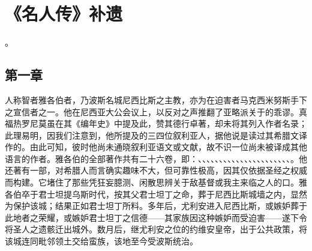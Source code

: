 
\chapter{《名人传》补遗}


。\par

\par


\section{第一章}

人称智者雅各伯者，乃波斯名城尼西比斯之主教，亦为在迫害者马克西米努斯手下之宣信者之一。他在尼西亚大公会议上，以反对之声推翻了亚略派关于的乖谬。真福热罗尼莫虽在其《编年史》中提及此，赞其德行卓著，却未将其列入作者名录；此理易明，因我们注意到，他所提及的三四位叙利亚人，据他说是读过其希腊文译作的。由此可知，彼时他尚未通晓叙利亚语文或文献，故不识一位尚未被译成其他语言的作者。雅各伯的全部著作共有二十六卷，即：、、、、、、、、、、、、、、、、、、、、、、。他还著有一部，对希腊人而言确实趣味不大，但可靠性极高，因其仅依据圣经之权威而构建。它堵住了那些凭狂妄臆测、闲散思辨关于敌基督或我主来临之人的口。雅各伯卒于君士坦提乌斯时代，按其父君士坦丁之命，葬于尼西比斯城墙之内，显然为保护该城；结果正如君士坦丁所料。多年后，尤利安进入尼西比斯，或嫉妒葬于此地者之荣耀，或嫉妒君士坦丁之信德——其家族因这种嫉妒而受迫害——遂下令将圣人之遗骸迁出城外。数月后，继尤利安之位的约维安皇帝，出于公共政策，将该城连同毗邻领土交给蛮族，该地至今受波斯统治。\par

